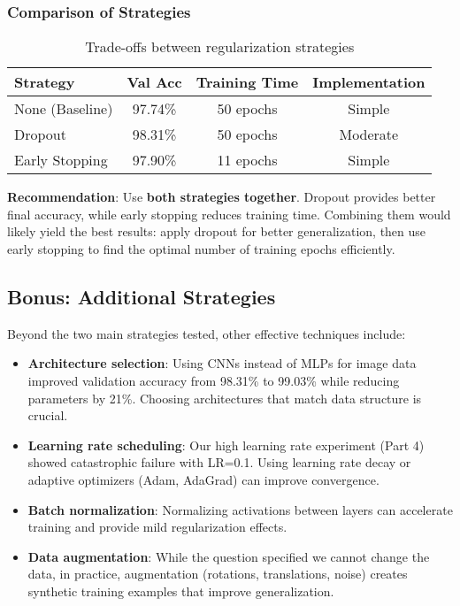 \subsubsection{Comparison of Strategies}

\begin{table}[h]
\centering
\begin{tabular}{|l|c|c|c|}
\hline
\textbf{Strategy} & \textbf{Val Acc} & \textbf{Training Time} & \textbf{Implementation} \\ \hline
None (Baseline) & 97.74\% & 50 epochs & Simple \\ \hline
Dropout & 98.31\% & 50 epochs & Moderate \\ \hline
Early Stopping & 97.90\% & 11 epochs & Simple \\ \hline
\end{tabular}
\caption{Trade-offs between regularization strategies}
\label{tab:strategy-comparison}
\end{table}

\textbf{Recommendation}: Use \textbf{both strategies together}. Dropout provides better final accuracy, while early stopping reduces training time. Combining them would likely yield the best results: apply dropout for better generalization, then use early stopping to find the optimal number of training epochs efficiently.

\subsection{Bonus: Additional Strategies}

Beyond the two main strategies tested, other effective techniques include:

\begin{itemize}
    \item \textbf{Architecture selection}: Using CNNs instead of MLPs for image data improved validation accuracy from 98.31\% to 99.03\% while reducing parameters by 21\%. Choosing architectures that match data structure is crucial.
    
    \item \textbf{Learning rate scheduling}: Our high learning rate experiment (Part 4) showed catastrophic failure with LR=0.1. Using learning rate decay or adaptive optimizers (Adam, AdaGrad) can improve convergence.
    
    \item \textbf{Batch normalization}: Normalizing activations between layers can accelerate training and provide mild regularization effects.
    
    \item \textbf{Data augmentation}: While the question specified we cannot change the data, in practice, augmentation (rotations, translations, noise) creates synthetic training examples that improve generalization.
\end{itemize}